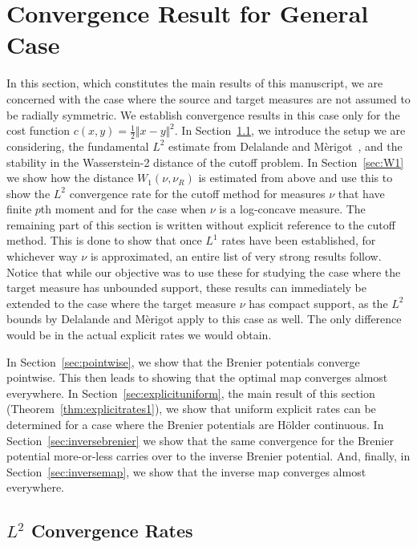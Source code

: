 \documentclass{amsart}
\theoremstyle{lemma}
\theoremstyle{remark}
\begin{document}
\section{Convergence Result for General Case}\label{sec:general}
In this section, which constitutes the main results of this manuscript, we are concerned with the case where the source and target measures are not assumed to be radially symmetric. We establish convergence results in this case only for the cost function $c(x,y) = \frac{1}{2}\Vert x - y \Vert^2$. In Section~\ref{sec:L2}, we introduce the setup we are considering, the fundamental $L^2$ estimate from Delalande and M\`{e}rigot~\cite{merigot1}, and the stability in the Wasserstein-2 distance of the cutoff problem. In Section~\ref{sec:W1} we show how the distance $W_1(\nu, \nu_{R})$ is estimated from above and use this to show the $L^2$ convergence rate for the cutoff method for measures $\nu$ that have finite $p$th moment and for the case when $\nu$ is a log-concave measure. The remaining part of this section is written without explicit reference to the cutoff method. This is done to show that once $L^1$ rates have been established, for whichever way $\nu$ is approximated, an entire list of very strong results follow. Notice that while our objective was to use these for studying the case where the target measure has unbounded support, these results can immediately be extended to the case where the target measure $\nu$ has compact support, as the $L^2$ bounds by Delalande and M\`{e}rigot apply to this case as well. The only difference would be in the actual explicit rates we would obtain.

In Section~\ref{sec:pointwise}, we show that the Brenier potentials converge pointwise. This then leads to showing that the optimal map converges almost everywhere. In Section~\ref{sec:explicituniform}, the main result of this section (Theorem~\ref{thm:explicitrates1}), we show that uniform explicit rates can be determined for a case where the Brenier potentials are H\"{o}lder continuous. In Section~\ref{sec:inversebrenier} we show that the same convergence for the Brenier potential more-or-less carries over to the inverse Brenier potential. And, finally, in Section~\ref{sec:inversemap}, we show that the inverse map converges almost everywhere.

\subsection{$L^2$ Convergence Rates}\label{sec:L2}
\end{document}
